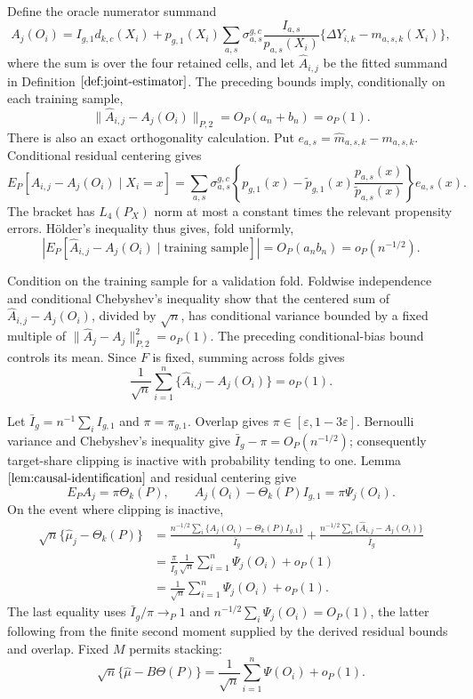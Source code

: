 Define the oracle numerator summand
\[
 A_j(O_i)=I_{g,1}d_{k,c}(X_i)
 +p_{g,1}(X_i)\sum_{a,s}\sigma_{a,s}^{g,c}
 \frac{I_{a,s}}{p_{a,s}(X_i)}
 \{\Delta Y_{i,k}-m_{a,s,k}(X_i)\},
\]
where the sum is over the four retained cells, and let \(\widehat A_{i,j}\) be the fitted summand in Definition \(\ref{def:joint-estimator}\). The preceding bounds imply, conditionally on each training sample,
\[
 \|\widehat A_{i,j}-A_j(O_i)\|_{P,2}=O_P(a_n+b_n)=o_P(1).
\]
There is also an exact orthogonality calculation. Put \(e_{a,s}=\widehat m_{a,s,k}-m_{a,s,k}\). Conditional residual centering gives
\[
 E_P[\widehat A_{i,j}-A_j(O_i)\mid X_i=x]
 =\sum_{a,s}\sigma_{a,s}^{g,c}
 \left\{p_{g,1}(x)-\widetilde p_{g,1}(x)
 \frac{p_{a,s}(x)}{\widetilde p_{a,s}(x)}\right\}e_{a,s}(x).
\]
The bracket has \(L_4(P_X)\) norm at most a constant times the relevant propensity errors. Hölder's inequality thus gives, fold uniformly,
\[
 \left|E_P[\widehat A_{i,j}-A_j(O_i)\mid\text{training sample}]\right|
 =O_P(a_nb_n)=o_P(n^{-1/2}).
\]

Condition on the training sample for a validation fold. Foldwise independence and conditional Chebyshev's inequality show that the centered sum of \(\widehat A_{i,j}-A_j(O_i)\), divided by \(\sqrt n\), has conditional variance bounded by a fixed multiple of \(\|\widehat A_j-A_j\|_{P,2}^2=o_P(1)\). The preceding conditional-bias bound controls its mean. Since \(F\) is fixed, summing across folds gives
\[
 \frac1{\sqrt n}\sum_{i=1}^n\{\widehat A_{i,j}-A_j(O_i)\}=o_P(1).
\]

Let \(\bar I_g=n^{-1}\sum_i I_{g,1}\) and \(\pi=\pi_{g,1}\). Overlap gives \(\pi\in[\varepsilon,1-3\varepsilon]\). Bernoulli variance and Chebyshev's inequality give \(\bar I_g-\pi=O_P(n^{-1/2})\); consequently target-share clipping is inactive with probability tending to one. Lemma \(\ref{lem:causal-identification}\) and residual centering give
\[
 E_PA_j=\pi\Theta_k(P),
 \qquad
 A_j(O_i)-\Theta_k(P)I_{g,1}=\pi\Psi_j(O_i).
\]
On the event where clipping is inactive,
\[
\begin{aligned}
 \sqrt n\{\widehat\mu_j-\Theta_k(P)\}
 &=\frac{n^{-1/2}\sum_i\{A_j(O_i)-\Theta_k(P)I_{g,1}\}}{\bar I_g}
   +\frac{n^{-1/2}\sum_i\{\widehat A_{i,j}-A_j(O_i)\}}{\bar I_g}\\
 &=\frac{\pi}{\bar I_g}\frac1{\sqrt n}\sum_{i=1}^n\Psi_j(O_i)+o_P(1)\\
 &=\frac1{\sqrt n}\sum_{i=1}^n\Psi_j(O_i)+o_P(1).
\end{aligned}
\]
The last equality uses \(\bar I_g/\pi\to_P1\) and \(n^{-1/2}\sum_i\Psi_j(O_i)=O_P(1)\), the latter following from the finite second moment supplied by the derived residual bounds and overlap. Fixed \(M\) permits stacking:
\[
 \sqrt n\{\widehat\mu-B\Theta(P)\}
 =\frac1{\sqrt n}\sum_{i=1}^n\Psi(O_i)+o_P(1).
\]

